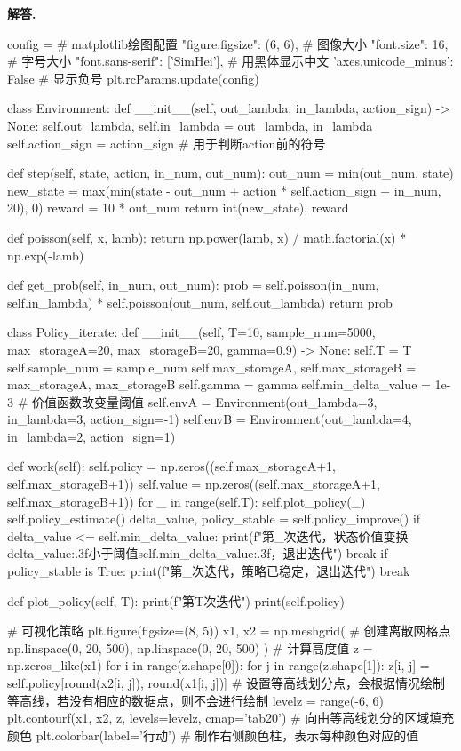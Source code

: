 \documentclass[12pt, a4paper, oneside]{ctexart}
\newenvironment{solution}[1][]{\par\noindent\textbf{#1解答. }}{\smallskip\par}  %
\begin{document}
\begin{solution}
\begin{pythoncode}
config = {  # matplotlib绘图配置
    "figure.figsize": (6, 6),  # 图像大小
    "font.size": 16, # 字号大小
    "font.sans-serif": ['SimHei'],   # 用黑体显示中文
    'axes.unicode_minus': False # 显示负号
}
plt.rcParams.update(config)

class Environment:
    def __init__(self, out_lambda, in_lambda, action_sign) -> None:
        self.out_lambda, self.in_lambda = out_lambda, in_lambda
        self.action_sign = action_sign  # 用于判断action前的符号
    
    def step(self, state, action, in_num, out_num):
        out_num = min(out_num, state)
        new_state = max(min(state - out_num + action * self.action_sign + in_num, 20), 0)
        reward = 10 * out_num
        return int(new_state), reward

    def poisson(self, x, lamb):
        return np.power(lamb, x) / math.factorial(x) * np.exp(-lamb)
    
    def get_prob(self, in_num, out_num):
        prob = self.poisson(in_num, self.in_lambda) * self.poisson(out_num, self.out_lambda)
        return prob


class Policy_iterate:
    def __init__(self, T=10, sample_num=5000, max_storageA=20, max_storageB=20, gamma=0.9) -> None:
        self.T = T
        self.sample_num = sample_num
        self.max_storageA, self.max_storageB = max_storageA, max_storageB
        self.gamma = gamma
        self.min_delta_value = 1e-3  # 价值函数改变量阈值
        self.envA = Environment(out_lambda=3, in_lambda=3, action_sign=-1)
        self.envB = Environment(out_lambda=4, in_lambda=2, action_sign=1)
    
    def work(self):
        self.policy = np.zeros((self.max_storageA+1, self.max_storageB+1))
        self.value = np.zeros((self.max_storageA+1, self.max_storageB+1))
        for _ in range(self.T):
            self.plot_policy(_)
            self.policy_estimate()
            delta_value, policy_stable = self.policy_improve()
            if delta_value <= self.min_delta_value:
                print(f"第{_}次迭代，状态价值变换{delta_value:.3f}小于阈值{self.min_delta_value:.3f}，退出迭代")
                break
            if policy_stable is True:
                print(f"第{_}次迭代，策略已稳定，退出迭代")
                break

    def plot_policy(self, T):
        print(f"第{T}次迭代")
        print(self.policy)

        # 可视化策略
        plt.figure(figsize=(8, 5))
        x1, x2 = np.meshgrid(  # 创建离散网格点
            np.linspace(0, 20, 500),
            np.linspace(0, 20, 500)
        )
        # 计算高度值
        z = np.zeros_like(x1)
        for i in range(z.shape[0]):
            for j in range(z.shape[1]):
                z[i, j] = self.policy[round(x2[i, j]), round(x1[i, j])]
        # 设置等高线划分点，会根据情况绘制等高线，若没有相应的数据点，则不会进行绘制
        levelz = range(-6, 6)
        plt.contourf(x1, x2, z, levels=levelz, cmap='tab20')  # 向由等高线划分的区域填充颜色
        plt.colorbar(label='行动')  # 制作右侧颜色柱，表示每种颜色对应的值


\end{pythoncode}
\end{solution}
\end{document}
